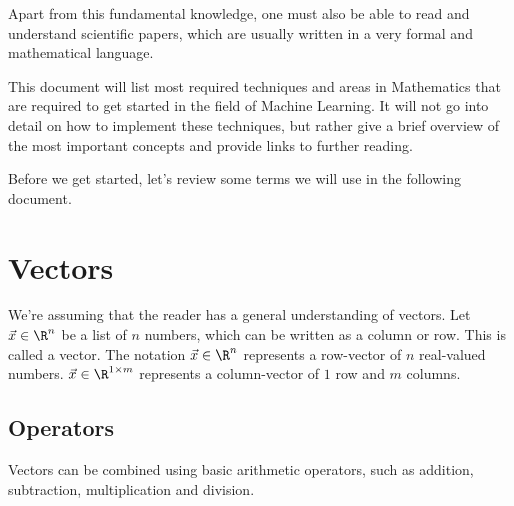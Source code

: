Apart from this fundamental knowledge, one must also be able to read and understand scientific papers, which are usually written in a very formal and mathematical language. 

This document will list most required techniques and areas in Mathematics that are required to get started in the field of Machine Learning. It will not go into detail on how to implement these techniques, but rather give a brief overview of the most important concepts and provide links to further reading.

Before we get started, let's review some terms we will use in the following document.

\section{Vectors}
We're assuming that the reader has a general understanding of vectors.
Let $\vec{x} \in \R^n$ be a list of $n$ numbers, which can be written as a column or row. This is called a vector. 
The notation $\vec{x} \in \R^n$ represents a row-vector of $n$ real-valued numbers. $\vec{x} \in \R^{1 \times m}$ represents a column-vector of $1$ row and $m$ columns.
\subsection{Operators}
Vectors can be combined using basic arithmetic operators, such as addition, subtraction, multiplication and division.

